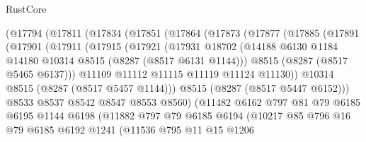 \begin{lexlean}{RustCore}
\begin{coremodule}
          (@17794
            (@17811
              (@17834
                (@17851
                  (@17864
                    (@17873
                      (@17877
                        (@17885
                          (@17891
                            (@17901
                              (@17911
                                (@17915
                                  (@17921
                                    (@17931
                                      @18702
                                      (@14188
                                        @6130
                                        @1184
                                        @14180
                                        @10314
                                        @8515
                                        (@8287 (@8517 @6131 @1144)))
                                      @8515
                                      (@8287 (@8517 @5465 @6137)))
                                    @11109
                                    @11112
                                    @11115
                                    @11119
                                    @11124
                                    @11130))
                                @10314
                                @8515
                                (@8287 (@8517 @5457 @1144)))
                              @8515
                              (@8287 (@8517 @5447 @6152)))
                            @8533
                            @8537
                            @8542
                            @8547
                            @8553
                            @8560)
                          (@11482
                            @6162
                            @797
                            @81
                            @79
                            @6185
                            @6195
                            @1144
                            @6198
                            (@11882
                              @797
                              @79
                              @6185
                              @6194
                              (@10217
                                @85
                                @796
                                @16
                                @79
                                @6185
                                @6192
                                @1241
                                (@11536
                                  @795
                                  @11
                                  @15
                                  @1206

\end{coremodule}
\end{lexlean}

